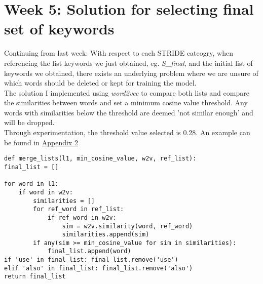 \section*{Week 5: Solution for selecting final set of keywords}

Continuing from last week: With respect to each STRIDE cateogry, when referencing the list keywords we just obtained, eg. \textit{S\_final}, and the initial list of keywords we obtained, there exists an underlying problem where we are unsure of which words should be deleted or kept for training the model.\\
The solution I implemented using \textit{word2vec} to compare both lists and compare the similarities between words and set a minimum cosine value threshold. Any words with similarities below the threshold are deemed 'not similar enough' and will be dropped. \\
Through experimentation, the threshold value selected is 0.28. An example can be found in \hyperref[subsec:appendix2]{Appendix 2}\\

\begin{lstlisting}[frame=single]
def merge_lists(l1, min_cosine_value, w2v, ref_list):
final_list = []

for word in l1:
    if word in w2v:
        similarities = []
        for ref_word in ref_list:
            if ref_word in w2v:
                sim = w2v.similarity(word, ref_word)
                similarities.append(sim)
        if any(sim >= min_cosine_value for sim in similarities):
            final_list.append(word)
if 'use' in final_list: final_list.remove('use')
elif 'also' in final_list: final_list.remove('also')
return final_list
\end{lstlisting}

